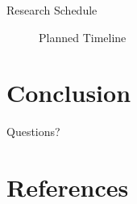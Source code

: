 \documentclass[xcolor={svgnames},aspectratio=169]{beamer}
\begin{document}
\begin{frame}{Research Schedule}
\begin{figure}[htbp]
\begin{center}
\begin{ganttchart}
        \end{ganttchart}
        \end{center}
        \caption{Planned Timeline}
        \label{fig:timeline}
    \end{figure}
\end{frame}

\section{Conclusion}

\begin{frame}
    \centering
    \Huge
    Questions?
\end{frame}

\section{References}

\renewcommand*{\bibfont}{\tiny}
\frame[allowframebreaks]{\printbibliography}
\end{document}
